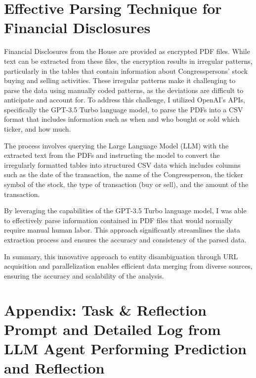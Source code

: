 \documentclass[15pt,letterpaper]{article}
\begin{document}
\section{Effective Parsing Technique for Financial Disclosures}\label{app:par}

Financial Disclosures from the House are provided as encrypted PDF files. While text can be extracted from these files, the encryption results in irregular patterns, particularly in the tables that contain information about Congresspersons' stock buying and selling activities. These irregular patterns make it challenging to parse the data using manually coded patterns, as the deviations are difficult to anticipate and account for. To address this challenge, I utilized OpenAI's APIs, specifically the GPT-3.5 Turbo language model, to parse the PDFs into a CSV format that includes information such as when and who bought or sold which ticker, and how much.

The process involves querying the Large Language Model (LLM) with the extracted text from the PDFs and instructing the model to convert the irregularly formatted tables into structured CSV data which includes columns such as the date of the transaction, the name of the Congressperson, the ticker symbol of the stock, the type of transaction (buy or sell), and the amount of the transaction.

By leveraging the capabilities of the GPT-3.5 Turbo language model, I was able to effectively parse information contained in PDF files that would normally require manual human labor. This approach significantly streamlines the data extraction process and ensures the accuracy and consistency of the parsed data.


In summary, this innovative approach to entity disambiguation through URL acquisition and parallelization enables efficient data merging from diverse sources, ensuring the accuracy and scalability of the analysis.

\section{Appendix: Task \& Reflection Prompt and Detailed Log from LLM Agent Performing Prediction and Reflection} \label{app:log}
\end{document}
